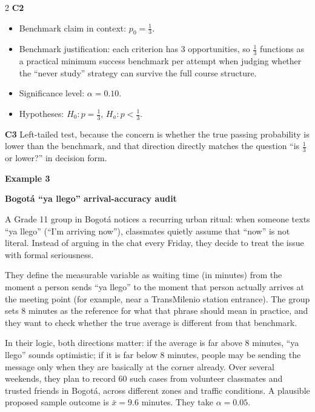 \documentclass[12pt]{article}
\newcommand{\SubsectionBox}[1]{%
\noindent\colorbox{gray!30}{%
\parbox{\linewidth}{\textbf{#1}}%
}\par\vspace{0.35cm}%
}
\begin{document}
\begin{multicols}{2}
\textbf{C2}
\begin{itemize}
\item Benchmark claim in context: \(p_0=\frac{1}{3}\).
\item Benchmark justification: each criterion has 3 opportunities, so \(\frac{1}{3}\) functions as a practical minimum success benchmark per attempt when judging whether the ``never study'' strategy can survive the full course structure.
\item Significance level: \(\alpha=0.10\).
\item Hypotheses: \(H_0\colon p=\frac{1}{3}\), \(H_a\colon p<\frac{1}{3}\).
\end{itemize}

\textbf{C3}
Left-tailed test, because the concern is whether the true passing probability is lower than the benchmark, and that direction directly matches the question ``is \(\frac{1}{3}\) or lower?'' in decision form.



\vspace{0.25cm}
\SubsectionBox{Example 3}\vspace{-0.25cm}

\textbf{Bogotá ``ya llego'' arrival-accuracy audit}

A Grade 11 group in Bogotá notices a recurring urban ritual: when someone texts ``ya llego'' (``I'm arriving now''), classmates quietly assume that ``now'' is not literal. Instead of arguing in the chat every Friday, they decide to treat the issue with formal seriousness.

They define the measurable variable as waiting time (in minutes) from the moment a person sends ``ya llego'' to the moment that person actually arrives at the meeting point (for example, near a TransMilenio station entrance). The group sets 8 minutes as the reference for what that phrase should mean in practice, and they want to check whether the true average is different from that benchmark.


In their logic, both directions matter: if the average is far above 8 minutes, ``ya llego'' sounds optimistic; if it is far below 8 minutes, people may be sending the message only when they are basically at the corner already. Over several weekends, they plan to record 60 such cases from volunteer classmates and trusted friends in Bogotá, across different zones and traffic conditions. A plausible proposed sample outcome is \(\bar{x}=9.6\) minutes. They take \(\alpha=0.05\).


\end{multicols}
\end{document}
